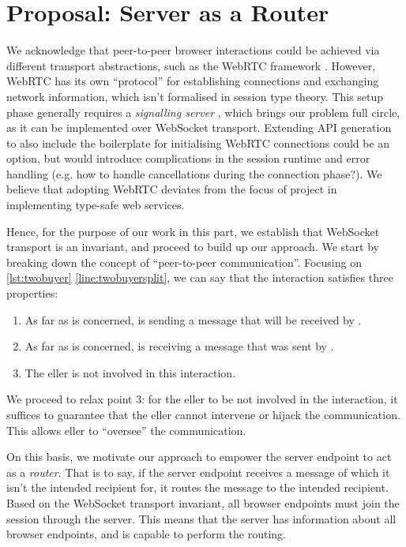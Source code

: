 \section{Proposal: Server as a Router}
\label{section:routerapproach}

We acknowledge that peer-to-peer browser interactions
could be achieved via different transport abstractions, 
such as the WebRTC framework \cite{WebRTC}. 
However, WebRTC has its own ``protocol'' 
for establishing connections and exchanging network information,
which isn't formalised in session type theory. This setup phase
generally requires a \textit{signalling server} \cite{WebRTCSignaling},
which brings our problem full circle, as it can be implemented
over WebSocket transport. Extending API generation to also include
the boilerplate for initialising WebRTC connections could be an option,
but would introduce complications in the session runtime and
error handling (e.g. how to handle cancellations during the connection
phase?).
We believe that adopting WebRTC deviates from the focus of project in 
implementing type-safe web services.

Hence, for the purpose of our work in this part,
we establish that WebSocket transport is an invariant, 
and proceed to build up our approach. 
We start by breaking down the concept of 
``peer-to-peer communication''.
Focusing on \cref{lst:twobuyer} \cref{line:twobuyersplit},
we can say that the interaction satisfies three properties:

\begin{enumerate}
\item 
As far as  is concerned,  is sending
a message that will be received by .

\item
As far as  is concerned,  is receiving
a message that was sent by .

\item
The eller is not involved in this interaction.
\end{enumerate}

We proceed to relax point 3: for the eller to be
not involved in the interaction, it suffices to guarantee that
the eller cannot intervene or hijack the communication.
This allows eller to ``oversee'' the communication.

On this basis, we motivate our approach to empower the 
server endpoint to act as a \textit{router}. 
That is to say, if the server endpoint receives a message
of which it isn't the intended recipient for, 
it routes the message to the intended recipient. 
Based on the WebSocket transport invariant,
all browser endpoints must join the session
through the server. This means that the server has information about
all browser endpoints, 
and is capable to perform the routing.

